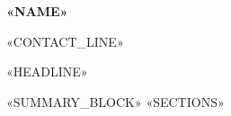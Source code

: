 \documentclass[11pt]{article}
\begin{document}
{\bfseries\Large «NAME»}\par
{«CONTACT_LINE»}\par\vspace{2pt}
«HEADLINE»\par\vspace{4pt}
«SUMMARY_BLOCK»
«SECTIONS»
\end{document}
